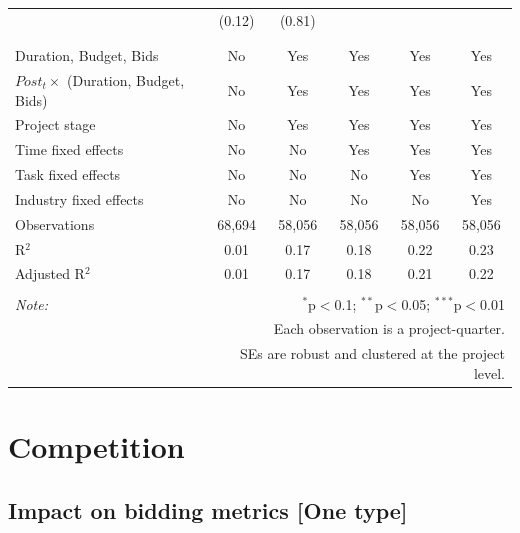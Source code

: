 \documentclass[
]{article}
\begin{document}
\begin{table}[H]
\begin{tabular}{@{\extracolsep{-2pt}}lccccc}
  & (0.12) & (0.81) &  &  &  \\ 
  & & & & & \\ 
\hline \\[-1.8ex] 
Duration, Budget, Bids & No & Yes & Yes & Yes & Yes \\ 
$Post_t \times $  (Duration, Budget, Bids) & No & Yes & Yes & Yes & Yes \\ 
Project stage & No & Yes & Yes & Yes & Yes \\ 
Time fixed effects & No & No & Yes & Yes & Yes \\ 
Task fixed effects & No & No & No & Yes & Yes \\ 
Industry fixed effects & No & No & No & No & Yes \\ 
Observations & 68,694 & 58,056 & 58,056 & 58,056 & 58,056 \\ 
R$^{2}$ & 0.01 & 0.17 & 0.18 & 0.22 & 0.23 \\ 
Adjusted R$^{2}$ & 0.01 & 0.17 & 0.18 & 0.21 & 0.22 \\ 
\hline 
\hline \\[-1.8ex] 
\textit{Note:}  & \multicolumn{5}{r}{$^{*}$p$<$0.1; $^{**}$p$<$0.05; $^{***}$p$<$0.01} \\ 
 & \multicolumn{5}{r}{Each observation is a project-quarter.} \\ 
 & \multicolumn{5}{r}{SEs are robust and clustered at the project level.} \\ 
\end{tabular} 
\end{table}

\hypertarget{competition}{%
\section{Competition}\label{competition}}

\hypertarget{impact-on-bidding-metrics-one-type}{%
\subsection{Impact on bidding metrics {[}One
type{]}}\label{impact-on-bidding-metrics-one-type}}
\end{document}
